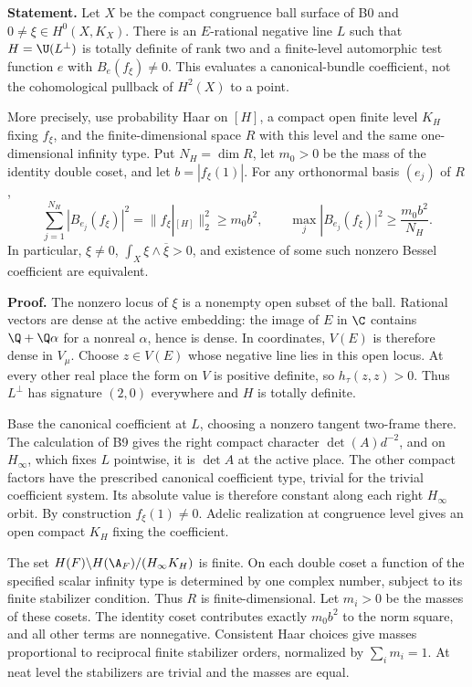 \textbf{Statement.} Let $X$ be the compact congruence ball surface of B0 and $0\ne\xi\in H^0(X,K_X)$. There is an $E$-rational negative line $L$ such that $H=\U(L^\perp)$ is totally definite of rank two and a finite-level automorphic test function $e$ with $B_e(f_\xi)\ne0$. This evaluates a canonical-bundle coefficient, not the cohomological pullback of $H^2(X)$ to a point.

More precisely, use probability Haar on $[H]$, a compact open finite level $K_H$ fixing $f_\xi$, and the finite-dimensional space $R$ with this level and the same one-dimensional infinity type. Put $N_H=\dim R$, let $m_0>0$ be the mass of the identity double coset, and let $b=|f_\xi(1)|$. For any orthonormal basis $(e_j)$ of $R$,
\[
 \sum_{j=1}^{N_H}|B_{e_j}(f_\xi)|^2
      =\|f_\xi|_{[H]}\|_2^2\geq m_0b^2,
 \qquad
 \max_j|B_{e_j}(f_\xi)|^2\geq\frac{m_0b^2}{N_H}.
 \tag{B12}
\]
In particular, $\xi\ne0$, $\int_X\xi\wedge\overline\xi>0$, and existence of some such nonzero Bessel coefficient are equivalent.

\textbf{Proof.} The nonzero locus of $\xi$ is a nonempty open subset of the ball. Rational vectors are dense at the active embedding: the image of $E$ in $\C$ contains $\Q+\Q\alpha$ for a nonreal $\alpha$, hence is dense. In coordinates, $V(E)$ is therefore dense in $V_\mu$. Choose $z\in V(E)$ whose negative line lies in this open locus. At every other real place the form on $V$ is positive definite, so $h_\tau(z,z)>0$. Thus $L^\perp$ has signature $(2,0)$ everywhere and $H$ is totally definite.

Base the canonical coefficient at $L$, choosing a nonzero tangent two-frame there. The calculation of B9 gives the right compact character $\det(A)d^{-2}$, and on $H_\infty$, which fixes $L$ pointwise, it is $\det A$ at the active place. The other compact factors have the prescribed canonical coefficient type, trivial for the trivial coefficient system. Its absolute value is therefore constant along each right $H_\infty$ orbit. By construction $f_\xi(1)\ne0$. Adelic realization at congruence level gives an open compact $K_H$ fixing the coefficient.

The set $H(F)\backslash H(\A_F)/(H_\infty K_H)$ is finite. On each double coset a function of the specified scalar infinity type is determined by one complex number, subject to its finite stabilizer condition. Thus $R$ is finite-dimensional. Let $m_i>0$ be the masses of these cosets. The identity coset contributes exactly $m_0b^2$ to the norm square, and all other terms are nonnegative. Consistent Haar choices give masses proportional to reciprocal finite stabilizer orders, normalized by $\sum_i m_i=1$. At neat level the stabilizers are trivial and the masses are equal.

